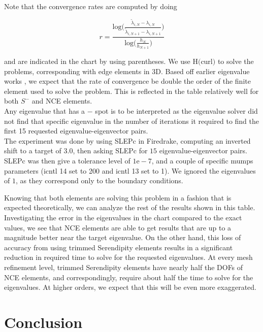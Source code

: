 \documentclass[manuscript,screen]{acmart}
\begin{document}
Note that the convergence rates are computed by doing

\[r = \frac{\text{log}\bigg(\frac{\tilde{\lambda}_{i,N} - \lambda_{i,N}}{\tilde{\lambda}_{i,N+1} - \lambda_{i,N+1}} \bigg)}{\text{log}\bigg( \frac{h_N}{h_{N+1}} \bigg)} \]

\noindent and are indicated in the chart by using parentheses.  We use H$($curl$)$ to solve the problems, corresponding with edge elements in 3D.  Based off earlier eigenvalue works \cite{boffi2010finite}, we expect that the rate of convergence be double the order of the finite element used to solve the problem.  This is reflected in the table relatively well for both $S^-$ and NCE elements.\\

Any eigenvalue that has a $-$ spot is to be interpreted as the eigenvalue solver did not find that specific eigenvalue in the number of iterations it required to find the first 15 requested eigenvalue-eigenvector pairs.\\

The experiment was done by using SLEPc in Firedrake, computing an inverted shift to a target of $3.0$, then asking SLEPc for $15$ eigenvalue-eigenvector pairs.  SLEPc was then give a tolerance level of $1\text{e}-7$, and a couple of specific mumps parameters (icntl 14 set to 200 and icntl 13 set to 1).  We ignored the eigenvalues of $1$, as they correspond only to the boundary conditions. 

Knowing that both elements are solving this problem in a fashion that is expected theoretically, we can analyze the rest of the results shown in this table.  Investigating the error in the eigenvalues in the chart compared to the exact values, we see that NCE elements are able to get results that are up to a magnitude better near the target eigenvalue.  On the other hand, this loss of accuracy from using trimmed Serendipity elements results in a significant reduction in required time to solve for the requested eigenvalues.  At every mesh refinement level, trimmed Serendipity elements have nearly half the DOFs of NCE elements, and correspondingly, require about half the time to solve for the eigenvalues.  At higher orders, we expect that this will be even more exaggerated.  \\

\section{Conclusion}
\end{document}
